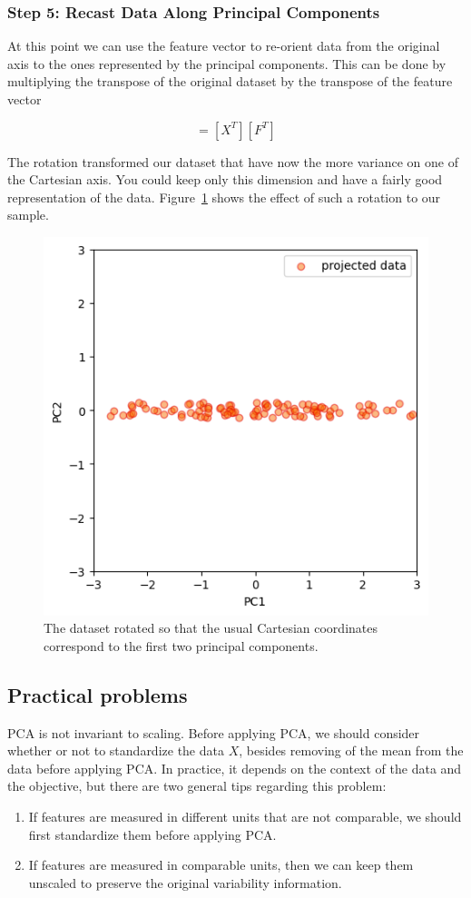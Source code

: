 \begin{enumerate}
\subsubsection*{Step 5: Recast Data Along Principal Components}

At this point we can use the feature vector to re-orient data from the original axis to the ones represented by the principal components. 
This can be done by multiplying the transpose of the original dataset by the transpose of the feature vector

\begin{equation}
[Y] = [X^T][F^T]
\end{equation}

The rotation transformed our dataset that have now the more variance on one of the Cartesian axis. 
You could keep only this dimension and have a fairly good representation of the data. Figure~\ref{fig:pca_rotated} shows the effect of such a rotation to our sample.
\begin{figure}[hbtp]
\centering
\includegraphics[width=0.5\linewidth]{figures/pca_projected}
\caption{The dataset rotated so that the usual Cartesian coordinates correspond to the first two principal components.}
\label{fig:pca_rotated}
\end{figure}

\subsection{Practical problems}
PCA is not invariant to scaling. Before applying PCA, we should consider whether or not to standardize the data $X$, besides removing of the mean from the data before applying PCA. In practice, it depends on the context of the data and the objective, but there are two general tips regarding this problem:
\begin{enumerate}
	\item If features are measured in different units that are not comparable, we should first standardize them before applying PCA.
	\item If features are measured in comparable units, then we can keep them unscaled to preserve the original variability information.
\end{enumerate}


\end{enumerate}
